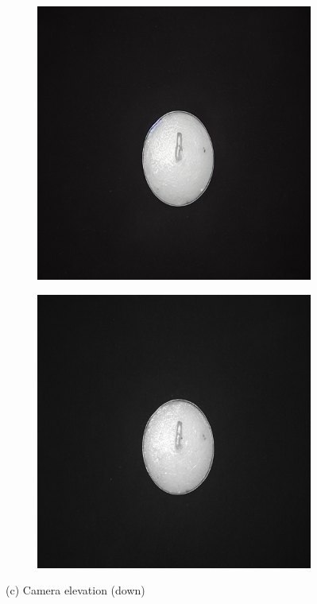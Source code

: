 \documentclass[12pt,DIV14,BCOR12mm,a4paper,footinclude=false,headinclude,parskip=half-,twoside,openright,cleardoublepage=empty,toc=index,bibliography=totoc,listof=totoc]{scrreprt}
\numberwithin{equation}{chapter}
\begin{document}
\begin{figure}
    \vspace{0.3cm} %

    \begin{subfigure}[t]{0.45\textwidth}
        \centering
        \includegraphics[width=\textwidth]{../media/diff_candles_down_real.png}
    \end{subfigure}%
    \hspace{0.02\textwidth}%
    \begin{subfigure}[t]{0.45\textwidth}
        \centering
        \includegraphics[width=\textwidth]{../media/diff_candles_down_fake.png}
    \end{subfigure}
    \caption*{(c) Camera elevation (down)}

\end{figure}
\end{document}
